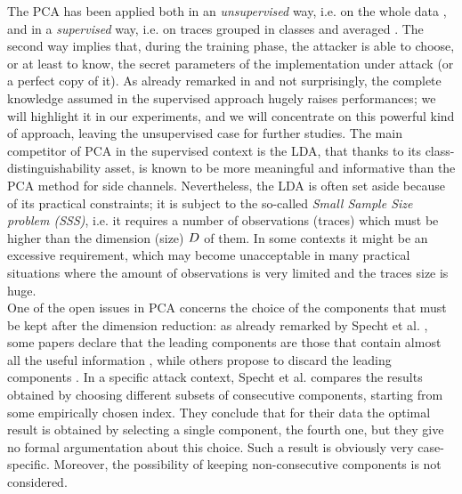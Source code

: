  The PCA has been applied both in an {\em unsupervised} way, i.e. on the whole data \cite{Batina2012,karsmakers2009side}, and in a {\em supervised} way, i.e. on traces grouped in classes and averaged \cite{TAprincipal,choudaryefficient,choudary2014efficient,disassembler,Standaert2008}. The second way implies that, during the training phase, the attacker is able to choose, or at least to know, the secret parameters of the implementation under attack (or a perfect copy of it). As already remarked in \cite{disassembler} and not surprisingly, the complete knowledge assumed in the supervised approach hugely raises performances; we will highlight it in our experiments, and we will concentrate on this powerful kind of approach, leaving the unsupervised case for further studies. The main competitor of PCA in the supervised context is the LDA, that thanks to its class-distinguishability asset, is known to be more meaningful and informative \cite{lessIsMore,Standaert2008} than the PCA method  for side channels. Nevertheless, the LDA is often set aside because of its practical constraints; it is subject to the so-called {\em Small Sample Size problem (SSS)}, i.e. it requires a number of observations (traces) which must be higher than the dimension (size) $D$ of them. In some contexts it might be an excessive requirement, which may become unacceptable in many practical situations where the amount of observations is very limited and the traces size is huge.\\

 One of the open issues in PCA concerns the choice of the components that must be kept after the dimension reduction: as already remarked by Specht et al.  \cite{specht}, some papers declare that the leading components are those that contain almost all the useful information \cite{TAprincipal,choudary2014efficient}, while others propose to discard the leading components \cite{Batina2012}. In a specific attack context, Specht et al. compares the results obtained by choosing different subsets of consecutive components, starting from some empirically chosen index. They conclude that for their data the optimal result is obtained by selecting a single component, the fourth one, but they give no formal argumentation about this choice. Such a result is obviously very case-specific. Moreover, the possibility of keeping non-consecutive components is not considered. \\
 
